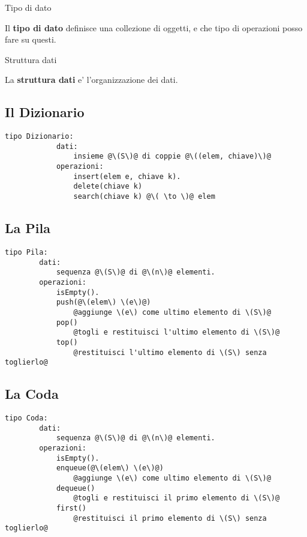 \begin{definition}{Tipo di dato}
        
    Il \textbf{tipo di dato} definisce una collezione di oggetti, e che tipo di operazioni posso
    fare su questi.
\end{definition}

\begin{definition}{Struttura dati}

    La \textbf{struttura dati} e' l'organizzazione dei dati.
\end{definition}

    \subsection{Il Dizionario}
        \begin{lstlisting}[escapechar=@]
            tipo Dizionario: 
            dati:
                insieme @\(S\)@ di coppie @\((elem, chiave)\)@ 
            operazioni:
                insert(elem e, chiave k).
                delete(chiave k)
                search(chiave k) @\( \to \)@ elem

        \end{lstlisting}
    
    \subsection{La Pila}
    \begin{lstlisting}[escapechar=@]
        tipo Pila: 
        dati:
            sequenza @\(S\)@ di @\(n\)@ elementi. 
        operazioni:
            isEmpty().
            push(@\(elem\) \(e\)@)
                @aggiunge \(e\) come ultimo elemento di \(S\)@
            pop()
                @togli e restituisci l'ultimo elemento di \(S\)@
            top()
                @restituisci l'ultimo elemento di \(S\) senza toglierlo@

    \end{lstlisting}

    \newpage
    \subsection{La Coda}
    \begin{lstlisting}[escapechar=@]
        tipo Coda: 
        dati:
            sequenza @\(S\)@ di @\(n\)@ elementi. 
        operazioni:
            isEmpty().
            enqueue(@\(elem\) \(e\)@)
                @aggiunge \(e\) come ultimo elemento di \(S\)@
            dequeue()
                @togli e restituisci il primo elemento di \(S\)@
            first()
                @restituisci il primo elemento di \(S\) senza toglierlo@

    \end{lstlisting}

